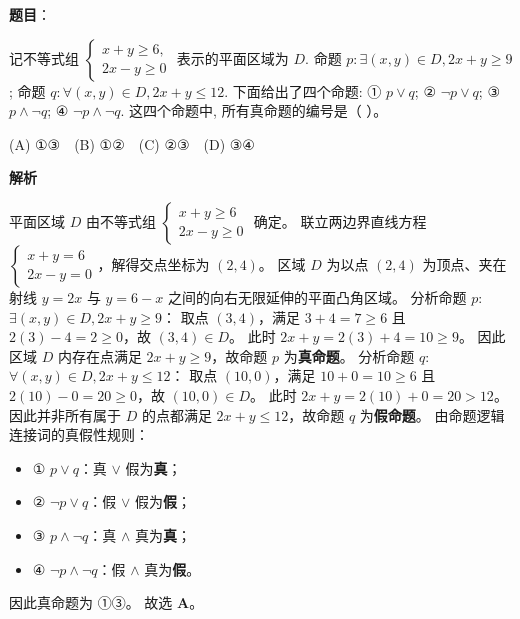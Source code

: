 \begin{answer}

\textbf{题目}：

记不等式组
$\begin{cases} x + y \geqslant 6, \\ 2x - y \geqslant 0 \end{cases}$
表示的平面区域为 $D$. 命题 $p: \exists (x, y) \in D, 2x + y \geqslant 9$; 命题 $q: \forall (x, y) \in D, 2x + y \leqslant 12$. 下面给出了四个命题:  
① $p \lor q$; ② $\neg p \lor q$; ③ $p \land \neg q$; ④ $\neg p \land \neg q$.  
这四个命题中, 所有真命题的编号是（ ）。

(A) ①③　(B) ①②　(C) ②③　(D) ③④

\textbf{解析}

平面区域 $D$ 由不等式组 $\begin{cases} x + y \geqslant 6 \\ 2x - y \geqslant 0 \end{cases}$ 确定。
联立两边界直线方程 $\begin{cases} x + y = 6 \\ 2x - y = 0 \end{cases}$，解得交点坐标为 $(2, 4)$。
区域 $D$ 为以点 $(2, 4)$ 为顶点、夹在射线 $y = 2x$ 与 $y = 6 - x$ 之间的向右无限延伸的平面凸角区域。
分析命题 $p$: $\exists (x, y) \in D, 2x + y \geqslant 9$：
取点 $(3, 4)$，满足 $3 + 4 = 7 \geqslant 6$ 且 $2(3) - 4 = 2 \geqslant 0$，故 $(3, 4) \in D$。
此时 $2x + y = 2(3) + 4 = 10 \geqslant 9$。
因此区域 $D$ 内存在点满足 $2x + y \geqslant 9$，故命题 $p$ 为\textbf{真命题}。
分析命题 $q$: $\forall (x, y) \in D, 2x + y \leqslant 12$：
取点 $(10, 0)$，满足 $10 + 0 = 10 \geqslant 6$ 且 $2(10) - 0 = 20 \geqslant 0$，故 $(10, 0) \in D$。
此时 $2x + y = 2(10) + 0 = 20 > 12$。
因此并非所有属于 $D$ 的点都满足 $2x + y \leqslant 12$，故命题 $q$ 为\textbf{假命题}。
由命题逻辑连接词的真假性规则：
\begin{itemize}
\item ① $p \lor q$：真 $\lor$ 假为\textbf{真}；
\item ② $\neg p \lor q$：假 $\lor$ 假为\textbf{假}；
\item ③ $p \land \neg q$：真 $\land$ 真为\textbf{真}；
\item ④ $\neg p \land \neg q$：假 $\land$ 真为\textbf{假}。
\end{itemize}
因此真命题为 ①③。
故选 \textbf{A}。


\end{answer}
